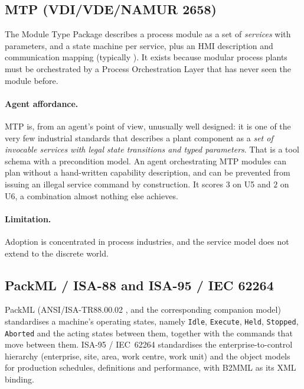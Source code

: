 \subsection{MTP (VDI/VDE/NAMUR 2658)}

The Module Type Package \cite{vdi2658} describes a process module as a set of
\emph{services} with parameters, and a state machine per service, plus an HMI
description and communication mapping (typically \opcua). It exists because
modular process plants must be orchestrated by a Process Orchestration Layer
that has never seen the module before.

\paragraph{Agent affordance.} MTP is, from an agent's point of view, unusually
well designed: it is one of the very few industrial standards that describes a
plant component as a \emph{set of invocable services with legal state
transitions and typed parameters}. That is a tool schema with a precondition
model. An agent orchestrating MTP modules can plan without a hand-written
capability description, and can be prevented from issuing an illegal service
command by construction. It scores $3$ on U5 and $2$ on U6, a combination almost
nothing else achieves.

\paragraph{Limitation.} Adoption is concentrated in process industries, and the
service model does not extend to the discrete world.

\subsection{PackML / ISA-88 and ISA-95 / IEC 62264}

PackML (ANSI/ISA-TR88.00.02 \cite{isa88}, and the corresponding \opcua{}
companion model) standardises a machine's operating states, namely
\texttt{Idle}, \texttt{Execute}, \texttt{Held}, \texttt{Stopped},
\texttt{Aborted} and the acting states between them, together with the commands
that move between them. ISA-95 /
IEC~62264 \cite{iec62264} standardises the enterprise-to-control hierarchy
(enterprise, site, area, work centre, work unit) and the object models for
production schedules, definitions and performance, with B2MML as its XML
binding.

